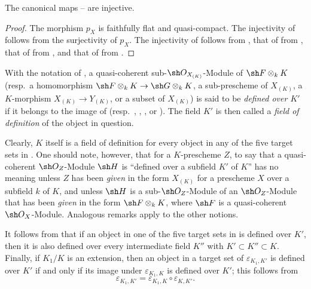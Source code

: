 
\begin{proposition}[4.8.3]
\label{IV.4.8.3}
The canonical maps -- are
injective.
\end{proposition}

\begin{proof}
The morphism $p_X$ is faithfully flat and quasi-compact.
The injectivity of  follows from the surjectivity of
$p_X$.
The injectivity of  follows from
, that of  from
, that of  from
, and that of  from
.
\end{proof}

\begin{definition}[4.8.4]
\label{IV.4.8.4}
With the notation of , a quasi-coherent
sub-$\sh O_{X_{(K)}}$-Module of $\sh F\otimes_kK$
(resp.\ a homomorphism
$\sh F\otimes_kK\to\sh G\otimes_kK$, a sub-prescheme of $X_{(K)}$,
a $K$-morphism $X_{(K)}\to Y_{(K)}$, or a subset of $X_{(K)}$)
is said to be \emph{defined over $K'$} if it belongs to the image of
(resp.\ , ,
, or ).
The field $K'$ is then called a \emph{field of definition} of the
object in question.
\end{definition}

Clearly, $K$ itself is a field of definition for every object in any
of the five target sets in .
One should note, however, that for a $K$-prescheme $Z$, to say that a
quasi-coherent $\sh O_Z$-Module $\sh H$ is ``defined over a subfield
$K'$ of $K$'' has no meaning unless $Z$ has been \emph{given} in the
form $X_{(K)}$ for a prescheme $X$ over a subfield $k$ of $K$, and
unless $\sh H$ is a sub-$\sh O_Z$-Module of an $\sh O_Z$-Module that
has been \emph{given} in the form $\sh F\otimes_kK$, where $\sh F$ is
a quasi-coherent $\sh O_X$-Module.
Analogous remarks apply to the other notions.

It follows from  that if an object in one of the
five target sets in  is defined over $K'$, then it is
also defined over every intermediate field $K''$ with
$K'\subset K''\subset K$.
Finally, if $K_1/K$ is an extension, then an object in a target set
of $\varepsilon_{K_1,K'}$ is defined over $K'$ if and only if its image under
$\varepsilon_{K_1,K}$ is defined over $K'$; this follows from
\[
\varepsilon_{K_1,K'}=\varepsilon_{K_1,K}\circ\varepsilon_{K,K'}.
\]

